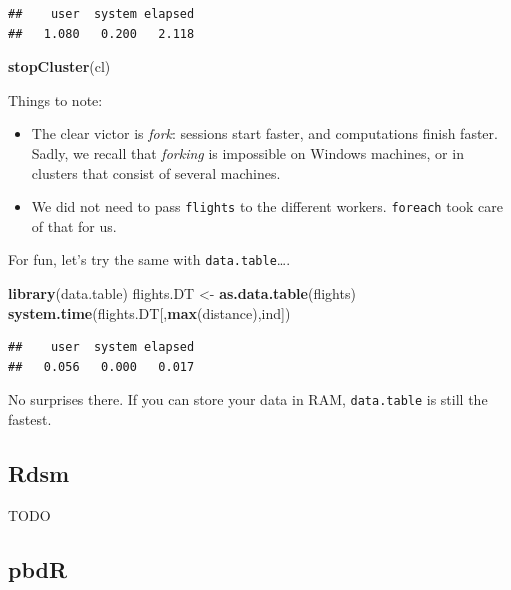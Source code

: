 \documentclass[]{book}
\newenvironment{Shaded}{\begin{snugshade}}{\end{snugshade}}
\newcommand{\KeywordTok}[1]{\textcolor[rgb]{0.13,0.29,0.53}{\textbf{#1}}}
\newcommand{\NormalTok}[1]{#1}
\newcommand{\StringTok}[1]{\textcolor[rgb]{0.31,0.60,0.02}{#1}}
\providecommand{\tightlist}{%
  \setlength{\itemsep}{0pt}\setlength{\parskip}{0pt}}
\theoremstyle{definition}
\theoremstyle{definition}
\theoremstyle{definition}
\theoremstyle{remark}
\begin{document}
\begin{verbatim}
##    user  system elapsed 
##   1.080   0.200   2.118
\end{verbatim}

\begin{Shaded}
\begin{Highlighting}[]
\KeywordTok{stopCluster}\NormalTok{(cl)}
\end{Highlighting}
\end{Shaded}

Things to note:

\begin{itemize}
\tightlist
\item
  The clear victor is \emph{fork}: sessions start faster, and computations finish faster. Sadly, we recall that \emph{forking} is impossible on Windows machines, or in clusters that consist of several machines.
\item
  We did not need to pass \texttt{flights} to the different workers. \texttt{foreach} took care of that for us.
\end{itemize}

For fun, let's try the same with \texttt{data.table}\ldots{}.

\begin{Shaded}
\begin{Highlighting}[]
\KeywordTok{library}\NormalTok{(data.table)}
\NormalTok{flights.DT <-}\StringTok{ }\KeywordTok{as.data.table}\NormalTok{(flights)}
\KeywordTok{system.time}\NormalTok{(flights.DT[,}\KeywordTok{max}\NormalTok{(distance),ind])}
\end{Highlighting}
\end{Shaded}

\begin{verbatim}
##    user  system elapsed 
##   0.056   0.000   0.017
\end{verbatim}

No surprises there.
If you can store your data in RAM, \texttt{data.table} is still the fastest.

\hypertarget{rdsm}{%
\subsection{Rdsm}\label{rdsm}}

TODO

\hypertarget{pbdr}{%
\subsection{pbdR}\label{pbdr}}
\end{document}

